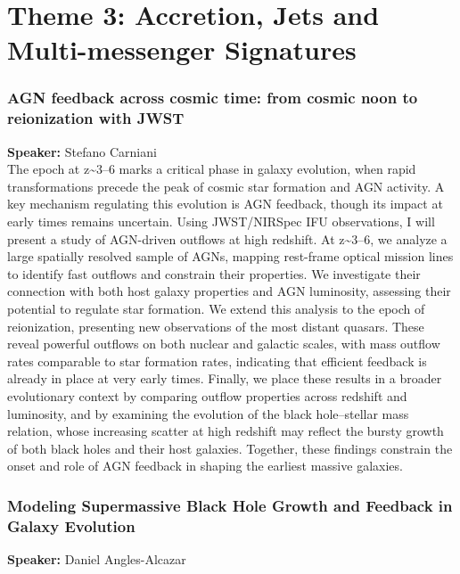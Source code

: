 \hypertarget{abs-day-thursday}{}

\section*{Theme 3: Accretion, Jets and Multi-messenger Signatures}

\hypertarget{abs-2}{}
\subsubsection*{AGN feedback across cosmic time: from cosmic noon to reionization with JWST}
\textbf{Speaker:} Stefano Carniani \invitedbadge{}\\

The epoch at z\textasciitilde{}3–6 marks a critical phase in galaxy evolution, when rapid transformations precede the peak of cosmic star formation and AGN activity. A key mechanism regulating this evolution is AGN feedback, though its impact at early times remains uncertain. Using JWST/NIRSpec IFU observations, I will present a study of AGN-driven outflows at high redshift. At z\textasciitilde{}3–6, we analyze a large spatially resolved sample of AGNs, mapping rest-frame optical mission lines to identify fast outflows and constrain their properties. We investigate their connection with both host galaxy properties and AGN luminosity, assessing their potential to regulate star formation.
We extend this analysis to the epoch of reionization, presenting new observations of the most distant quasars. These reveal powerful outflows on both nuclear and galactic scales, with mass outflow rates comparable to star formation rates, indicating that efficient feedback is already in place at very early times.
Finally, we place these results in a broader evolutionary context by comparing outflow properties across redshift and luminosity, and by examining the evolution of the black hole–stellar mass relation, whose increasing scatter at high redshift may reflect the bursty growth of both black holes and their host galaxies. Together, these findings constrain the onset and role of AGN feedback in shaping the earliest massive galaxies.

\hypertarget{abs-7}{}
\subsubsection*{Modeling Supermassive Black Hole Growth and Feedback in Galaxy Evolution}
\textbf{Speaker:} Daniel Angles-Alcazar \invitedbadge{}\\

